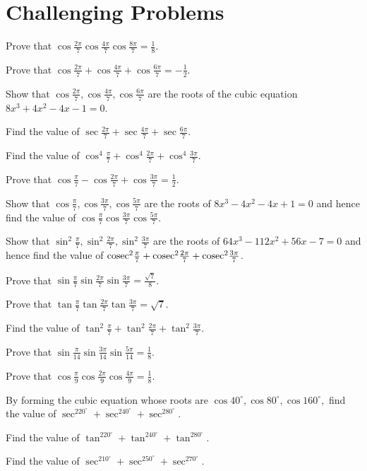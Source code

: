 \section{Challenging Problems}
\startitemize[n, 1*broad]
\item Prove that $\cos\frac{2\pi}{7}\cos\frac{4\pi}{7}\cos\frac{8\pi}{7} = \frac{1}{8}$.
\item Prove that $\cos\frac{2\pi}{7} + \cos\frac{4\pi}{7} + \cos\frac{6\pi}{7} = -\frac{1}{2}$.
\item Show that $\cos\frac{2\pi}{7}, \cos\frac{4\pi}{7}, \cos\frac{6\pi}{7}$ are the roots of the cubic equation $8x^3 + 4x^2
  - 4x - 1 = 0$.
\item Find the value of $\sec\frac{2\pi}{7} + \sec\frac{4\pi}{7} + \sec\frac{6\pi}{7}$.
\item Find the value of $\cos^4\frac{\pi}{7} + \cos^4\frac{2\pi}{7} + \cos^4\frac{3\pi}{7}$.
\item Prove that $\cos\frac{\pi}{7} - \cos\frac{2\pi}{7} + \cos\frac{3\pi}{7} = \frac{1}{2}$.
\item Show that $\cos\frac{\pi}{7}, \cos\frac{3\pi}{7}, \cos\frac{5\pi}{7}$ are the roots of $8x^3 - 4x^2 - 4x + 1 = 0$ and
  hence find the value of $\cos\frac{\pi}{7}\cos\frac{3\pi}{7}\cos\frac{5\pi}{7}$.
\item Show that $\sin^2\frac{\pi}{7}, \sin^2\frac{2\pi}{7}, \sin^2\frac{3\pi}{7}$ are the roots of $64x^3 - 112x^2 + 56x - 7 =
  0$ and hence find the value of ${\rm cosec}^2\frac{\pi}{7} + {\rm cosec}^2\frac{2\pi}{7} + {\rm cosec}^2\frac{3\pi}{7}$.
\item Prove that $\sin\frac{\pi}{7}\sin\frac{2\pi}{7}\sin\frac{3\pi}{7} = \frac{\sqrt{7}}{8}$.
\item Prove that $\tan\frac{\pi}{7}\tan\frac{2\pi}{7}\tan\frac{3\pi}{7} = \sqrt{7}$.
\item Find the value of $\tan^2\frac{\pi}{7} + \tan^2\frac{2\pi}{7} + \tan^2\frac{3\pi}{7}$.
\item Prove that $\sin\frac{\pi}{14}\sin\frac{3\pi}{14}\sin\frac{5\pi}{14} = \frac{1}{8}$.
\item Prove that $\cos\frac{\pi}{9}\cos\frac{2\pi}{9}\cos\frac{4\pi}{9} = \frac{1}{8}$.
\item By forming the cubic equation whose roots are $\cos40^\circ, \cos80^\circ, \cos160^\circ,$ find the value of
  $\sec^220^\circ + \sec^240^\circ + \sec^280^\circ$.
\item Find the value of $\tan^220^\circ + \tan^240^\circ + \tan^280^\circ$.
\item Find the value of $\sec^210^\circ + \sec^250^\circ + \sec^270^\circ$.
